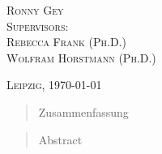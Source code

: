 \documentclass[12pt, a4paper, titlepage, oneside, abstract=true, toc=listof, toc=bibliography]{scrreprt}
\begin{document}
\begin{titlepage}
	
			\large
			\textsc{Ronny Gey}\\[0.8cm]%
			
	
			\textsc{Supervisors:\\ Rebecca Frank (Ph.D.)\\Wolfram Horstmann (Ph.D.)}
	
	
	
	\vfill\vfill\vfill %
	
	{\textsc{Leipzig, \today}} %
		 
	
	\vfill %
	
\end{titlepage}

\def\abstractname{Zusammenfassung}
\begin{abstract}
Zusammenfassung
\end{abstract}

\def\abstractname{Abstract}
\begin{abstract}
Abstract
\end{abstract}

\tableofcontents
\cleardoublepage
\listoftables
\cleardoublepage
\printacronyms
\cleardoublepage
{}
\end{document}
